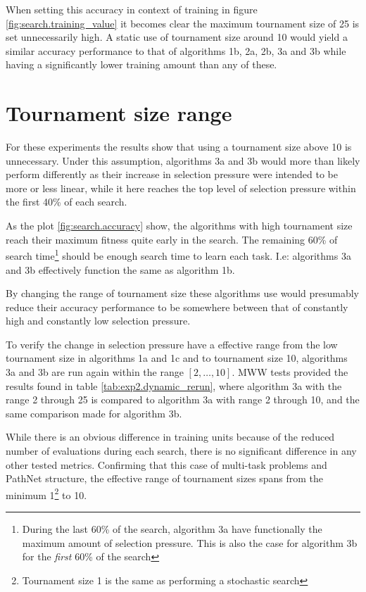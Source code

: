 When setting this accuracy in context of training in figure \ref{fig:search.training_value} it becomes clear the maximum tournament size of 25 is set unnecessarily high. A static use of tournament size around 10 would yield a similar accuracy performance to that of algorithms 1b, 2a, 2b, 3a and 3b while having a significantly lower training amount than any of these.

\section{Tournament size range}

For these experiments the results show that using a tournament size above 10 is unnecessary. Under this assumption, algorithms 3a and 3b would more than likely perform differently as their increase in selection pressure were intended to be more or less linear, while it here reaches the top level of selection pressure within the first 40\% of each search. 

As the plot \ref{fig:search.accuracy} show, the algorithms with high tournament size reach their maximum fitness quite early in the search. The remaining 60\% of search time\footnote{During the last 60\% of the search, algorithm 3a have functionally the maximum amount of selection pressure. This is also the case for algorithm 3b for the \textit{first} 60\% of the search} should be enough search time to learn each task. I.e: algorithms 3a and 3b effectively function the same as algorithm 1b.

By changing the range of tournament size these algorithms use would presumably reduce their accuracy performance to be somewhere between that of constantly high and constantly low selection pressure.

To verify the change in selection pressure have a effective range from the low tournament size in algorithms 1a and 1c and to tournament size 10, algorithms 3a and 3b are run again within the range \([2,\dots,10]\). MWW tests provided the results found in table \ref{tab:exp2.dynamic_rerun}, where algorithm 3a with the range 2 through 25 is compared to algorithm 3a with range 2 through 10, and the same comparison made for algorithm 3b. 



While there is an obvious difference in training units because of the reduced number of evaluations during each search, there is no significant difference in any other tested metrics. Confirming that this case of multi-task problems and PathNet structure, the effective range of tournament sizes spans from the minimum 1\footnote{Tournament size 1 is the same as performing a stochastic search} to 10.


